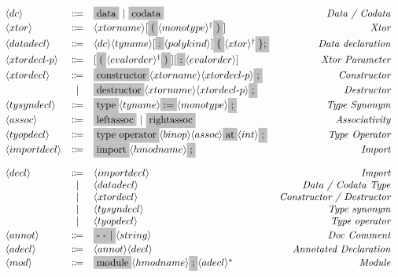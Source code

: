 \documentclass[11pt]{article}
\newcommand{\nonterminal}[1]{\langle #1 \rangle}
\newcommand{\terminal}[1]{\colorbox{lightgray}{\vphantom{X}#1}}
\newcommand{\commalist}[1]{#1^{\dagger}}
\begin{document}
\[
  \begin{array}{lclr}
    \nonterminal{dc} & \Coloneqq & \terminal{data}\ |\ \terminal{codata} & \emph{Data / Codata} \\
    \nonterminal{xtor} & \Coloneqq & \nonterminal{xtorname}[\terminal{(}\commalist{\nonterminal{monotype}}\terminal{)}] & \emph{Xtor} \\
    \nonterminal{datadecl} & \Coloneqq & \nonterminal{dc} \nonterminal{tyname} [\terminal{:} \nonterminal{polykind}] \terminal{$\{$} \commalist{\nonterminal{xtor}}\terminal{$\};$} & \emph{Data declaration} \\
    \nonterminal{xtordecl$-$p} & \Coloneqq & [\terminal{(} \commalist{\nonterminal{evalorder}} \terminal{)}] [\terminal{:} \nonterminal{evalorder}] & \emph{Xtor Parameter} \\
    \nonterminal{xtordecl} & \Coloneqq & \terminal{constructor} \nonterminal{xtorname} \nonterminal{xtordecl$-$p}\terminal{;} & \emph{Constructor} \\
    & | & \terminal{destructor} \nonterminal{xtorname}\nonterminal{xtordecl$-$p} \terminal{;} & \emph{Destructor} \\
    \nonterminal{tysyndecl} & \Coloneqq & \terminal{type} \nonterminal{tyname} \terminal{$:=$} \nonterminal{monotype}\terminal{;} & \emph{Type Synonym} \\
    \nonterminal{assoc} & \Coloneqq & \terminal{leftassoc}\ |\ \terminal{rightassoc} & \emph{Associativity} \\
    \nonterminal{tyopdecl} & \Coloneqq & \terminal{type operator} \nonterminal{binop} \nonterminal{assoc} \terminal{at} \nonterminal{int} \terminal{;} & \emph{Type Operator} \\
    \nonterminal{importdecl} & \Coloneqq & \terminal{import} \nonterminal{hmodname}\terminal{;} & \emph{Import} \\[4mm]
    \nonterminal{decl} & \Coloneqq & \nonterminal{importdecl}  & \emph{Import} \\
    & | & \nonterminal{datadecl} & \emph{Data / Codata Type} \\
    & | & \nonterminal{xtordecl} & \emph{Constructor / Destructor} \\
    & | & \nonterminal{tysyndecl} & \emph{Type synonym} \\
    & | & \nonterminal{tyopdecl} & \emph{Type operator} \\
    \nonterminal{annot} & \Coloneqq & \terminal{- - $|$} \nonterminal{string} & \emph{Doc Comment} \\
    \nonterminal{adecl} & \Coloneqq & \nonterminal{annot}\nonterminal{decl} & \emph{Annotated Declaration} \\
    \nonterminal{mod} & \Coloneqq & \terminal{module} \nonterminal{hmodname} \terminal{;} \nonterminal{adecl}^{\ast}& \emph{Module}
  \end{array}
\]
\end{document}
